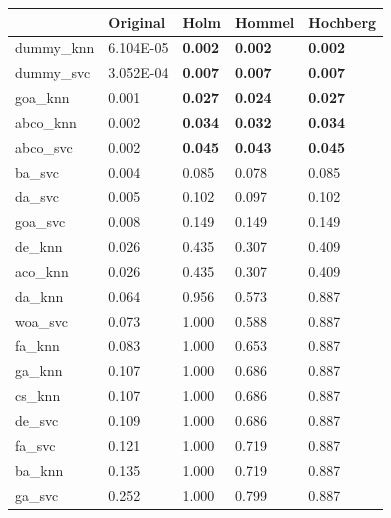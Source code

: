\begin{table}[htp]
    \centering
    \begin{tabular}{lllll}
        \toprule
        {}         & Original  & Holm           & Hommel         & Hochberg       \\
        \midrule
        dummy\_knn & 6.104E-05 & \textbf{0.002} & \textbf{0.002} & \textbf{0.002} \\
        dummy\_svc & 3.052E-04 & \textbf{0.007} & \textbf{0.007} & \textbf{0.007} \\
        goa\_knn   & 0.001     & \textbf{0.027} & \textbf{0.024} & \textbf{0.027} \\
        abco\_knn  & 0.002     & \textbf{0.034} & \textbf{0.032} & \textbf{0.034} \\
        abco\_svc  & 0.002     & \textbf{0.045} & \textbf{0.043} & \textbf{0.045} \\
        ba\_svc    & 0.004     & 0.085          & 0.078          & 0.085          \\
        da\_svc    & 0.005     & 0.102          & 0.097          & 0.102          \\
        goa\_svc   & 0.008     & 0.149          & 0.149          & 0.149          \\
        de\_knn    & 0.026     & 0.435          & 0.307          & 0.409          \\
        aco\_knn   & 0.026     & 0.435          & 0.307          & 0.409          \\
        da\_knn    & 0.064     & 0.956          & 0.573          & 0.887          \\
        woa\_svc   & 0.073     & 1.000          & 0.588          & 0.887          \\
        fa\_knn    & 0.083     & 1.000          & 0.653          & 0.887          \\
        ga\_knn    & 0.107     & 1.000          & 0.686          & 0.887          \\
        cs\_knn    & 0.107     & 1.000          & 0.686          & 0.887          \\
        de\_svc    & 0.109     & 1.000          & 0.686          & 0.887          \\
        fa\_svc    & 0.121     & 1.000          & 0.719          & 0.887          \\
        ba\_knn    & 0.135     & 1.000          & 0.719          & 0.887          \\
        ga\_svc    & 0.252     & 1.000          & 0.799          & 0.887          \\

\end{tabular}
\end{table}
